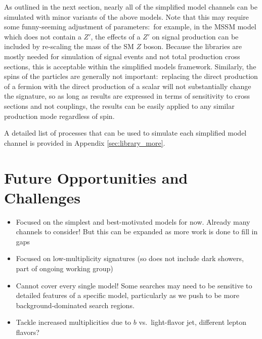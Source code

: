 As outlined in the next section, nearly all of the simplified model channels can be simulated with minor variants of the above models. Note that this may require some funny-seeming adjustment of parameters:~for example, in the MSSM model which does not contain a $Z'$, the effects of a $Z'$ on signal production can be included by re-scaling the mass of the SM $Z$ boson. Because the libraries are mostly needed for simulation of signal events and not total production cross sections, this is acceptable within the simplified models framework. Similarly, the spins of the particles are generally not important:~replacing the direct production of a fermion with the direct production of a scalar will not substantially change the signature, so as long as results are expressed in terms of sensitivity to cross sections and not couplings, the results can be easily applied to any similar production mode regardless of spin.

A detailed list of processes that can be used to simulate each simplified model channel is provided in Appendix \ref{sec:library_more}.




\section{Future Opportunities and Challenges}\label{sec:simplified_future}
\begin{itemize}
\item Focused on the simplest and best-motivated models for now. Already many channels to consider! But this can be expanded as more work is done to fill in gaps
\item Focused on low-multiplicity signatures (so does not include dark showers, part of ongoing working group)
\item Cannot cover every single model! Some searches may need to be sensitive to detailed features of a specific model, particularly as we push to be more background-dominated search regions.
\item Tackle increased multiplicities due to $b$ vs.~light-flavor jet, different lepton flavors?
\end{itemize}
